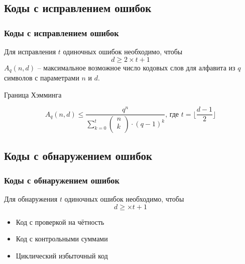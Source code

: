 \documentclass[utf8]{beamer}
\begin{document}
\subsection{Коды с исправлением ошибок}
\begin{frame}
 \frametitle{Коды с исправлением ошибок}
Для исправления $t$ одиночных ошибок необходимо, чтобы
$$
d \geq 2\times t + 1
$$
$A_q(n, d)$ -- максимальное возможное число кодовых слов для алфавита из $q$ символов с параметрами $n$ и $d$.
\begin{block}{Граница Хэмминга}
\end{block}
$$
A_q(n, d) \leq \frac
    {q^n}
    {\sum_{k=0}^t\left(
		    \begin{array}{c}
		    n \\
		    k \\
                    \end{array}
		 \right)
		 \cdot (q-1)^k}
\textrm{, где } t=\lfloor \frac{d-1}{2} \rfloor
$$
\end{frame}
\subsection{Коды с обнаружением ошибок}
\begin{frame}
 \frametitle{Коды с  обнаружением ошибок}
Для обнаружения $t$ одиночных ошибок необходимо, чтобы
$$
d \geq \times t + 1
$$
\begin{itemize}
 \item Код с проверкой на чётность
 \item Код с контрольными суммами
 \item Циклический избыточный код
\end{itemize}

\end{frame}
\end{document}

